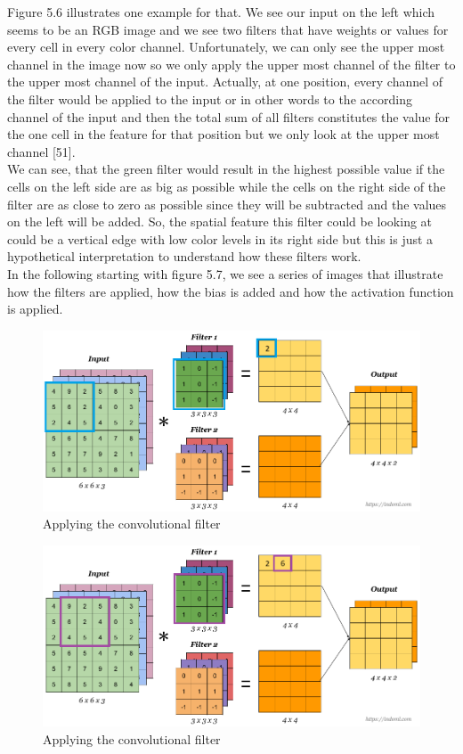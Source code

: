 \documentclass[a4paper,12pt]{report}
\begin{document}
Figure 5.6 illustrates one example for that. We see our input on the left which seems to be an RGB image and we see two filters that have weights or values for every cell in every color channel. Unfortunately, we can only see the upper most channel in the image now so we only apply the upper most channel of the filter to the upper most channel of the input. Actually, at one position, every channel of the filter would be applied to the input or in other words to the according channel of the input and then the total sum of all filters constitutes the value for the one cell in the feature for that position but we only look at the upper most channel [51].\\
	
We can see, that the green filter would result in the highest possible value if the cells on the left side are as big as possible while the cells on the right side of the filter are as close to zero as possible since they will be subtracted and the values on the left will be added. So, the spatial feature this filter could be looking at could be a vertical edge with low color levels in its right side but this is just a hypothetical interpretation to understand how these filters work.\\
	
In the following starting with figure 5.7, we see a series of images that illustrate how the filters are applied, how the bias is added and how the activation function is applied.
\begin{figure}[htbp]
  \centering
  \includegraphics[width=\textwidth]{images/CNN_filters_0.png}
  \caption{Applying the convolutional filter}
  \label{fig:fullwidth}
\end{figure}
	
\begin{figure}[htbp]
  \centering
  \includegraphics[width=\textwidth]{images/CNN_filters_1.png}
  \caption{Applying the convolutional filter}
  \label{fig:fullwidth}
\end{figure}
\end{document}
